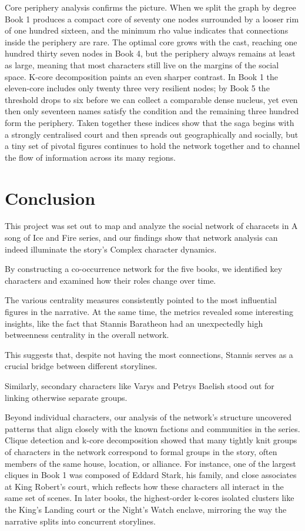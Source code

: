 \documentclass[12pt, a4paper]{article}
\begin{document}
Core periphery analysis confirms the picture. 
When we split the graph by degree Book 1 produces a compact core of seventy 
one nodes surrounded by a looser rim of one hundred sixteen,
 and the minimum rho value indicates that connections inside the periphery are rare. 
 The optimal core grows with the cast, reaching one hundred thirty seven nodes in Book 4,
  but the periphery always remains at least as large, 
  meaning that most characters still live on the margins of the social space. 
  K-core decomposition paints an even sharper contrast. 
  In Book 1 the eleven-core includes only twenty three very resilient nodes; 
  by Book 5 the threshold drops to six before we can collect a comparable dense nucleus, 
  yet even then only seventeen names satisfy the condition and the remaining three 
  hundred form the periphery. Taken together these indices show that the saga begins 
  with a strongly centralised court and then spreads out geographically and socially, 
  but a tiny set of pivotal figures continues to hold the network together and to channel 
  the flow of information across its many regions.

  
\section{Conclusion}
\label{conclusion}

This project was set out to map and analyze the social network of characets in A song of Ice and Fire series, and our findings show that network analysis can indeed illuminate the story's Complex character dynamics.

By constructing a co-occurrence network for the five books, we identified key characters and examined how their roles change over time.

The various centrality measures consistently pointed to the most influential figures in the narrative.  At the same time, the metrics revealed some interesting insights, like the fact that Stannis Baratheon had an unexpectedly high betweenness centrality in the overall network.

This suggests that, despite not  having the most connections, Stannis serves as a crucial bridge between different storylines.

Similarly, secondary characters like Varys and Petrys Baelish stood out for linking otherwise separate groups.



Beyond individual characters, our analysis of the network’s structure uncovered patterns that align closely with the known factions and communities in the series. 
Clique detection and k-core decomposition showed that many tightly knit groups of characters in the network correspond to formal groups in the story,
 often members of the same house, location, or alliance. 
 For instance, one of the largest cliques in Book 1 was composed of Eddard Stark, his family, and close associates at King Robert’s court, 
 which reflects how these characters all interact in the same set of scenes. 
 In later books, the highest-order k-cores isolated clusters like the King’s Landing court or the Night’s Watch enclave, 
 mirroring the way the narrative splits into concurrent storylines. 
\end{document}
